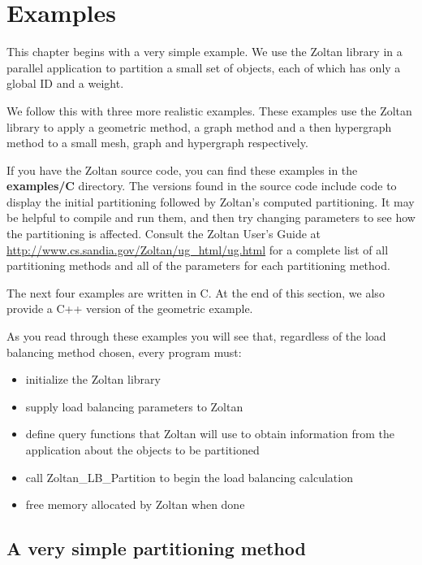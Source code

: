 %
%
\chapter{Examples}
\label{cha:examples}

This chapter begins with a very simple example.  We use the Zoltan
library in a parallel application to partition a small set of 
objects, each of which has only a global ID and a weight.

We follow this with three more realistic examples.
These examples use the Zoltan library to apply a geometric method,
a graph method and a then hypergraph method to a small mesh, graph
and hypergraph respectively.

If you have the Zoltan source code, you can find these
examples in the \textbf{examples/C} directory.  The versions
found in the source code include code to
display the initial partitioning followed by Zoltan's computed
partitioning.  It may be helpful to compile and run them, and
then try changing parameters 
to see how the partitioning is affected.  Consult the Zoltan
User's Guide at
\url{http://www.cs.sandia.gov/Zoltan/ug_html/ug.html}
for a complete list of all partitioning methods and all of the
parameters for each partitioning method.

The next four examples are written in C.  At the end of this section,
we also provide a C++ version of the geometric example.

As you read through these examples you will see that, regardless 
of the load balancing method chosen, every program must:

\begin{itemize}
\item initialize the Zoltan library
\item supply load balancing parameters to Zoltan
\item define query functions that Zoltan will use to obtain information from the application about the objects to be partitioned
\item call Zoltan\_LB\_Partition to begin the load balancing calculation
\item free memory allocated by Zoltan when done
\end{itemize}

\clearpage
\section{A very simple partitioning method}

